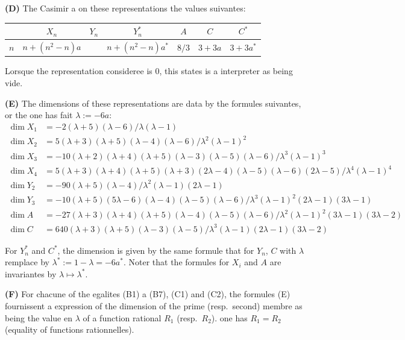 \documentclass[11pt,a4paper]{article}
\begin{document}
\medskip
\noindent\textbf{(D)} The Casimir a on these representations the values suivantes:

\begin{center}
\begin{tabular}{c|cccccc}
 & $X_n$ & $Y_n$ & $Y_n^*$ & $A$ & $C$ & $C^*$ \\
\hline
$n$ & $n + (n^2 - n)a$ & & $n + (n^2 - n)a^*$ & $8/3$ & $3 + 3a$ & $3 + 3a^*$
\end{tabular}
\end{center}

Lorsque the representation consideree is $0$, this states is a interpreter as being vide.

\medskip
\noindent\textbf{(E)} The dimensions of these representations are data by the formules suivantes, or the one has fait $\lambda := -6a$:
\begin{align*}
\dim X_1 &= -2(\lambda + 5)(\lambda - 6)/\lambda(\lambda - 1) \\
\dim X_2 &= 5(\lambda + 3)(\lambda + 5)(\lambda - 4)(\lambda - 6)/\lambda^2(\lambda - 1)^2 \\
\dim X_3 &= -10(\lambda + 2)(\lambda + 4)(\lambda + 5)(\lambda - 3)(\lambda - 5)(\lambda - 6)/\lambda^3(\lambda - 1)^3 \\
\dim X_4 &= 5(\lambda + 3)(\lambda + 4)(\lambda + 5)(\lambda + 3)(2\lambda - 4)(\lambda - 5)(\lambda - 6)(2\lambda - 5)/\lambda^4(\lambda - 1)^4 \\
\dim Y_2 &= -90(\lambda + 5)(\lambda - 4)/\lambda^2(\lambda - 1)(2\lambda - 1) \\
\dim Y_3 &= -10(\lambda + 5)(5\lambda - 6)(\lambda - 4)(\lambda - 5)(\lambda - 6)/\lambda^3(\lambda - 1)^2(2\lambda - 1)(3\lambda - 1) \\
\dim A &= -27(\lambda + 3)(\lambda + 4)(\lambda + 5)(\lambda - 4)(\lambda - 5)(\lambda - 6)/\lambda^2(\lambda - 1)^2(3\lambda - 1)(3\lambda - 2) \\
\dim C &= 640(\lambda + 3)(\lambda + 5)(\lambda - 3)(\lambda - 5)/\lambda^3(\lambda - 1)(2\lambda - 1)(3\lambda - 2)
\end{align*}

For $Y_n^*$ and $C^*$, the dimension is given by the same formule that for $Y_n$, $C$ with $\lambda$ remplace by $\lambda^* := 1 - \lambda = -6a^*$. Noter that the formules for $X_i$ and $A$ are invariantes by $\lambda \mapsto \lambda^*$.

\medskip
\noindent\textbf{(F)} For chacune of the egalites (B1) a (B7), (C1) and (C2), the formules (E) fournissent a expression of the dimension of the prime (resp.~second) membre as being the value en $\lambda$ of a function rational $R_1$ (resp.~$R_2$). one has $R_1 = R_2$ (equality of functions rationnelles).
\end{document}
